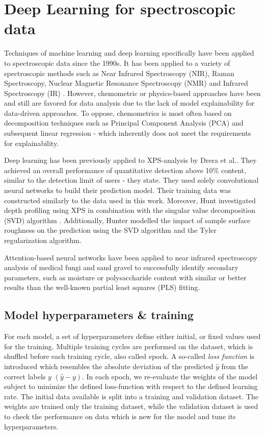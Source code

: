 \label{DL_theory}
\section{Deep Learning for spectroscopic data}

Techniques of machine learning and deep learning specifically have been applied to spectroscopic data since the 1990s. It has been applied to a variety of spectroscopic methods such as Near Infrared Spectroscopy (NIR), Raman Spectroscopy, Nuclear Magnetic Resonance Spectroscopy (NMR) and Infrared Spectroscopy (IR) . However, chemometric or physics-based approaches have been and still are favored for data analysis due to the lack of model explainability for data-driven approaches. To oppose, chemometrics is most often based on decomposition techniques such as Principal Component Analysis (PCA) and subsequent linear regression - which inherently does not meet the requirements for explainability.

Deep learning has been previously applied to XPS-analysis by Drera et al.\cite{drera_deep_2019}. They achieved an overall performance of quantitative detection above 10$\%$ content, similar to the detection limit of users - they state. They used solely convolutional neural networks to build their prediction model. Their training data was constructed similarly to the data used in this work. Moreover, Hunt investigated depth profiling using XPS in combination with the singular value decomposition (SVD) algorithm \cite{hunt_depth_2000}. Additionally, Hunter modelled the impact of sample surface roughness on the prediction using the SVD algorithm and the Tyler regularization algorithm.

Attention-based neural networks have been applied to near infrared spectroscopy analysis of medical fungi \cite{huang_attention_2019} and sand gravel \cite{yuan_hybrid_2022} to successfully identify secondary parameters, such as moisture or polysaccharide content with similar or better results than the well-known partial least squares (PLS) fitting.

\subsection{Model hyperparameters \& training}
For each model, a set of hyperparameters define either initial, or fixed values used for the training. 
Multiple training cycles are performed on the dataset, which is shuffled before each training cycle, also called epoch. A so-called \emph{loss function} is introduced which resembles the absolute deviation of the predicted $\hat{y}$ from the correct labels $y$ $(\hat{y} - y)$.
In each epoch, we re-evaluate the weights of the model subject to minimize the defined loss-function with respect to the defined learning rate. The initial data available is split into a training and validation dataset. The weights are trained only the training dataset, while the validation dataset is used to check the performance on data which is new for the model and tune its hyperparameters.

